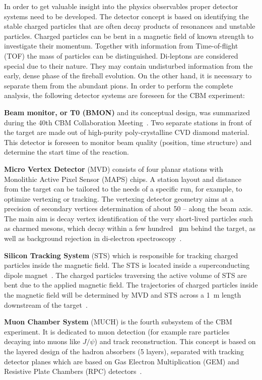 In order to get valuable insight into the physics observables proper detector systems need to be developed. The detector concept is based on identifying the stable charged particles that are often decay products of resonances and unstable particles. Charged particles can be bent in a magnetic field of known strength to investigate their momentum. Together with information from Time-of-flight (\gls{TOF}) the mass of particles can be distinguished. Di-leptons are considered special due to their nature. They may contain undisturbed information from the early, dense phase of the fireball evolution. On the other hand, it is necessary to separate them from the abundant pions. In order to perform the complete analysis, the following detector systems are foreseen for the \gls{CBM} experiment:\bigbreak


\textbf{Beam monitor, or T0 (\gls{BMON})} and its conceptual design, was summarized during the 40th \gls{CBM} Collaboration Meeting~\cite{bmon}. Two separate stations in front of the target are made out of high-purity poly-crystalline CVD diamond material. This detector is foreseen to monitor beam quality (position, time structure) and determine the start time of the reaction.\bigbreak

\textbf{Micro Vertex Detector} (\gls{MVD}) consists of four planar stations with Monolithic Active Pixel Sensor (\gls{MAPS}) chips. A station layout and distance from the target can be tailored to the needs of a specific run, for example, to optimize vertexing or tracking. The vertexing detector geometry aims at a precision of secondary vertices determination of about 50 --  along the beam axis. The main aim is decay vertex identification of the very short-lived particles such as charmed mesons, which decay within a few hundred \SI{}{\micro\metre} behind the target, as well as background rejection in di-electron spectroscopy~\cite{MVD}.\bigbreak

 \textbf{Silicon Tracking System} (\gls{STS}) which is responsible for tracking charged particles inside the magnetic field. The \gls{STS} is located inside a superconducting dipole magnet~\cite{Malakhov:109025}. The charged particles traversing the active volume of \gls{STS} are bent due to the applied magnetic field. The trajectories of charged particles inside the magnetic field will be determined by MVD and STS across a \SI{1}{\metre} length downstream of the target~\cite{Heuser:54798}.\bigbreak
 
\textbf{Muon Chamber System} (\gls{MUCH}) is the fourth subsystem of the \gls{CBM} experiment. It is dedicated to muon detection (for example rare particles decaying into muons like $J/\psi$) and track reconstruction. This concept is based on the layered design of the hadron absorbers (5 layers), separated with tracking detector planes which are based on Gas Electron Multiplication (\gls{GEM}) and Resistive Plate Chambers (\gls{RPC}) detectors~\cite{MUCH}.\bigbreak

